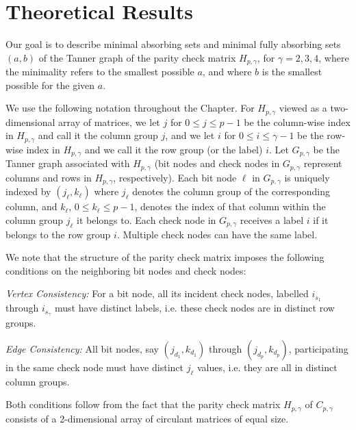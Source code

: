 \section{Theoretical Results}\label{theo1}

Our goal is to describe minimal absorbing sets and minimal fully
absorbing sets $(a,b)$ of the Tanner graph of the parity check
matrix $H_{p,\gamma}$, for $\gamma =2,3,4$, where the minimality
refers to the smallest possible $a$, and where $b$ is the smallest
possible for the given $a$.

We use the following notation throughout the Chapter. For
$H_{p,\gamma}$ viewed as a two-dimensional array of matrices, we
let $j$ for $0 \leq j \leq p-1$ be the column-wise index in
$H_{p,\gamma}$ and call it the column group $j$, and we let $i$
for $0 \leq i \leq \gamma-1$ be the row-wise index in
$H_{p,\gamma}$ and we call it the row group (or the label) $i$.
Let $G_{p,\gamma}$ be the Tanner graph associated with
$H_{p,\gamma}$ (bit nodes and check nodes in $G_{p,\gamma}$
represent columns and rows in $H_{p,\gamma}$, respectively). Each
bit node $\ell$ in $G_{p,\gamma}$ is uniquely indexed by
$(j_\ell,k_\ell)$ where $j_\ell$ denotes the column group of the
corresponding column, and $k_\ell$, $0 \leq k_\ell \leq p-1$,
denotes the index of that column within the column group $j_\ell$
it belongs to. Each check node in $G_{p,\gamma}$ receives a label
$i$ if it belongs to the row group $i$. Multiple check nodes can
have the same label.

We note that the structure of the parity check matrix imposes the
following conditions on the neighboring bit nodes and check nodes:

\textit{Vertex Consistency:} For a bit node, all its incident
check nodes, labelled $i_{s_1}$ through $i_{s_\gamma}$ must have
distinct labels, i.e. these check nodes are in distinct row
groups.

\textit{Edge Consistency:} All bit nodes, say $(j_{d_1},k_{d_1})$
through $(j_{d_p},k_{d_p})$, participating in the same check node
must have distinct $j_\ell$ values, i.e. they are all in distinct
column groups.

Both conditions follow from the fact that the parity check matrix
$H_{p,\gamma}$ of $C_{p,\gamma}$ consists of a 2-dimensional array
of circulant matrices of equal size.

